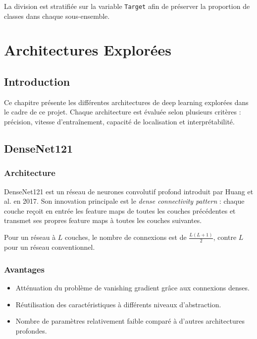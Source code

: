 \documentclass[12pt,a4paper,twoside]{report}
\begin{document}
La division est stratifiée sur la variable \texttt{Target} afin de préserver la proportion de classes dans chaque sous-ensemble.

\chapter{Architectures Explorées}

\section{Introduction}

Ce chapitre présente les différentes architectures de deep learning explorées dans le cadre de ce projet. Chaque architecture est évaluée selon plusieurs critères : précision, vitesse d'entraînement, capacité de localisation et interprétabilité.

\section{DenseNet121}

\subsection{Architecture}

DenseNet121 \cite{densenet} est un réseau de neurones convolutif profond introduit par Huang et al. en 2017. Son innovation principale est le \textit{dense connectivity pattern} : chaque couche reçoit en entrée les feature maps de toutes les couches précédentes et transmet ses propres feature maps à toutes les couches suivantes.

Pour un réseau à $L$ couches, le nombre de connexions est de $\frac{L(L+1)}{2}$, contre $L$ pour un réseau conventionnel.

\subsection{Avantages}
\begin{itemize}
  \item Atténuation du problème de vanishing gradient grâce aux connexions denses.
  \item Réutilisation des caractéristiques à différents niveaux d'abstraction.
  \item Nombre de paramètres relativement faible comparé à d'autres architectures profondes.
\end{itemize}
\end{document}
